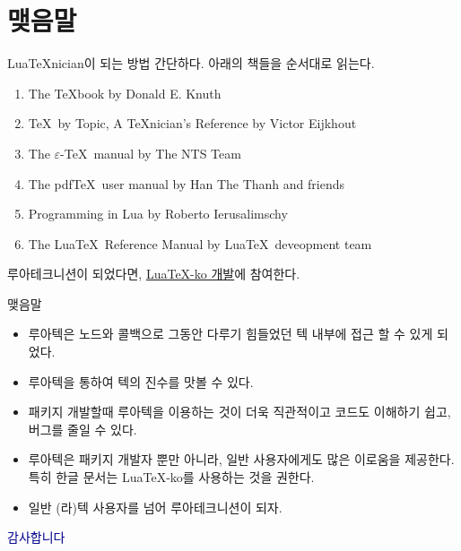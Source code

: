\documentclass[t,10pt]{beamer}
\begin{document}
\section{맺음말}

\begin{frame}[fragile]{Lua\TeX nician이 되는 방법}
  간단하다. 아래의 책들을 순서대로 읽는다.
  \begin{enumerate}
  \item \alert{The \TeX book} by Donald E. Knuth
  \item \alert{\TeX\ by Topic, A \TeX nician's Reference} by Victor Eijkhout
  \item \alert{The $\varepsilon$-\TeX\ manual} by The NTS Team
  \item \alert{The pdf\TeX\ user manual} by Han The Thanh and friends
  \item \alert{Programming in Lua} by Roberto Ierusalimschy
  \item \alert{The Lua\TeX\ Reference Manual} by Lua\TeX\ deveopment team
  \end{enumerate}

  루아테크니션이 되었다면, \alert{\href{http://github.com/dohyun/luatexko}%
  {Lua\TeX-ko 개발}}에 참여한다.
\end{frame}

\begin{frame}{맺음말}
  \begin{itemize}
  \item 루아텍은 노드와 콜백으로 그동안 다루기 힘들었던 텍 내부에 접근 할 수
    있게 되었다.
  \item 루아텍을 통하여 텍의 진수를 맛볼  수 있다.
  \item 패키지 개발할때 루아텍을 이용하는 것이 더욱 직관적이고 코드도 이해하기
    쉽고, 버그를 줄일 수 있다.
  \item 루아텍은 패키지 개발자 뿐만 아니라, 일반 사용자에게도 많은 이로움을
    제공한다. 특히 한글 문서는 Lua\TeX-ko를 사용하는 것을 권한다.
  \item 일반 (라)텍 사용자를 넘어 루아테크니션이 되자.
  \end{itemize}
\end{frame}

{
  \begin{frame}[standout]
    \LARGE\textcolor{DarkBlue}{감사합니다}
  \end{frame}
}
\end{document}

